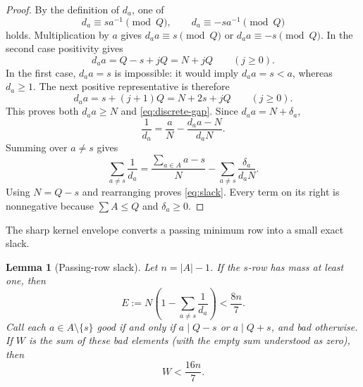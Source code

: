 \documentclass[11pt]{article}
\newtheorem{lemma}[theorem]{Lemma}
\theoremstyle{definition}
\theoremstyle{remark}
\begin{document}
\begin{proof}
By the definition of \(d_a\), one of
\[
 d_a\equiv sa^{-1}\pmod Q,
 \qquad
 d_a\equiv-sa^{-1}\pmod Q
\]
holds.  Multiplication by \(a\) gives
\(d_aa\equiv s\pmod Q\) or \(d_aa\equiv-s\pmod Q\).  In the second
case positivity gives
\[
 d_aa=Q-s+jQ=N+jQ\qquad(j\ge0).
\]
In the first case, \(d_aa=s\) is impossible: it would imply
\(d_a a=s<a\), whereas \(d_a\ge1\).  The next positive representative
is therefore
\[
 d_aa=s+(j+1)Q=N+2s+jQ\qquad(j\ge0).
\]
This proves both \(d_aa\ge N\) and \eqref{eq:discrete-gap}.  Since
\(d_aa=N+\delta_a\),
\[
 \frac1{d_a}=\frac aN-\frac{d_aa-N}{d_aN}.
\]
Summing over \(a\ne s\) gives
\[
 \sum_{a\ne s}\frac1{d_a}
 =\frac{\sum_{a\in A}a-s}{N}
  -\sum_{a\ne s}\frac{\delta_a}{d_aN}.
\]
Using \(N=Q-s\) and rearranging proves \eqref{eq:slack}.  Every term on
its right is nonnegative because \(\sum A\le Q\) and
\(\delta_a\ge0\).
\end{proof}

The sharp kernel envelope converts a passing minimum row into a small exact
slack.

\begin{lemma}[Passing-row slack]\label{lem:passing-slack}
Let \(n=|A|-1\).  If the \(s\)-row has mass at least one, then
\begin{equation}\label{eq:E-bound}
 E:=N\left(1-\sum_{a\ne s}\frac1{d_a}\right)
 <\frac{8n}{7}.
\end{equation}
Call each \(a\in A\setminus\{s\}\) \emph{good} if and only if
\(a\mid Q-s\) or \(a\mid Q+s\), and
\emph{bad} otherwise.
If \(W\) is the sum of these bad elements (with the empty sum understood as
zero), then
\begin{equation}\label{eq:bad-weight-general}
 W<\frac{16n}{7}.
\end{equation}
\end{lemma}
\end{document}

